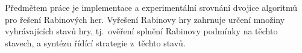 Předmětem práce je implementace a experimentální srovnání dvojice algoritmů pro řešení Rabinových her. Vyřešení Rabinovy hry zahrnuje určení množiny vyhrávajících stavů hry, tj.~ověření splnění Rabinovy podmínky na těchto stavech, a syntézu řídící strategie z~těchto stavů.